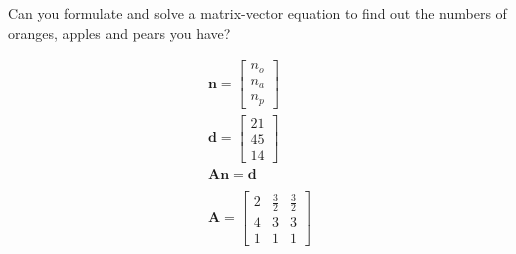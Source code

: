 Can you formulate and solve a matrix-vector equation to find out the numbers of oranges, apples and pears you have?

\begin{solution}
\begin{align*}
    \boldsymbol{n} = \begin{bmatrix}
        n_o \\ n_a \\ n_p
    \end{bmatrix} \\
    \boldsymbol{d} = \begin{bmatrix}
        21 \\ 45 \\ 14
    \end{bmatrix} \\
    \boldsymbol{An} = \boldsymbol{d} \\
    \ \\
    \boldsymbol{A} = \begin{bmatrix}
        2 & \frac{3}{2} & \frac{3}{2} \\
        4 & 3 & 3 \\
        1 & 1 & 1
    \end{bmatrix}
\end{align*}

\end{solution}